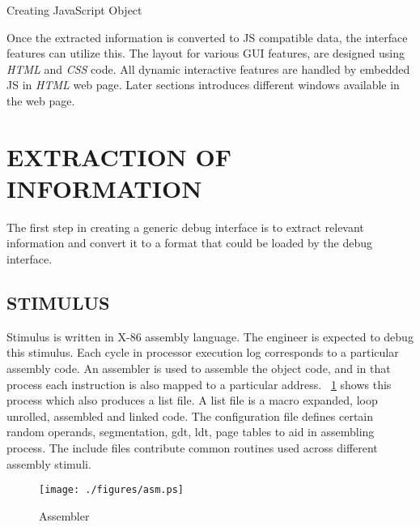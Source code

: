 \IncMargin{1em}
\begin{algorithm}[h]
\DontPrintSemicolon
{} 
\KwFn {}
\BlankLine
{}
\caption{Creating JavaScript Object}
\label{algo:impl:js}
\end{algorithm}\DecMargin{1em}



Once the extracted information is converted to JS compatible data, the interface features can utilize this. The layout for various GUI features, are designed using {\it HTML} and {\it CSS} code. All dynamic interactive features are handled by embedded JS in {\it HTML} web page. Later sections introduces different windows available in the web page.

\section {EXTRACTION OF INFORMATION}
The first step in creating a generic debug interface is to extract relevant information and convert it to a format that could be loaded by the debug interface.

\subsection {STIMULUS}
Stimulus is written in X-86 assembly language. The engineer is expected to debug this stimulus. Each cycle in processor execution log corresponds to a particular assembly code. An assembler is used to assemble the object code, and in that process each instruction is also mapped to a particular address. \figurename{~\ref{impl.tex:assembler}} shows this process which also produces a list file. A list file is a macro expanded, loop unrolled, assembled and linked code. The configuration file defines certain random operands, segmentation, gdt, ldt, page tables to aid in assembling process. The include files contribute common routines used across different assembly stimuli.


\begin{figure}[h]
\centering
\texttt{[image: ./figures/asm.ps]}
\caption{Assembler}
\label{impl.tex:assembler}
\end{figure}



